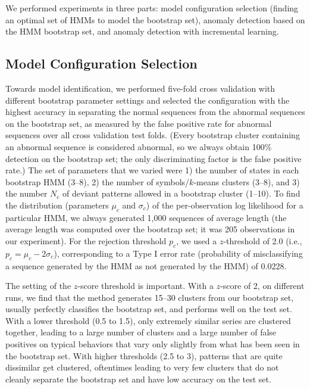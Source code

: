 We performed experiments in three parts: model configuration selection
(finding an optimal set of HMMs to model the bootstrap set), anomaly
detection based on the HMM bootstrap set, and anomaly detection with
incremental learning.

\subsection{Model Configuration Selection}
\label{incremental-model-selection}

Towards model identification, we performed five-fold cross validation
with different bootstrap parameter settings and selected the
configuration with the highest accuracy in separating the normal
sequences from the abnormal sequences on the bootstrap set, as
measured by the false positive rate for abnormal sequences over all
cross validation test folds. (Every bootstrap cluster containing an
abnormal sequence is considered abnormal, so we always obtain 100\%
detection on the bootstrap set; the only discriminating factor is the
false positive rate.) The set of parameters that we varied were 1) the
number of states in each bootstrap HMM (3--8), 2) the number of
symbols/$k$-means clusters (3--8), and 3) the number $N_c$ of deviant
patterns allowed in a bootstrap cluster (1--10). To find the
distribution (parameters $\mu_c$ and $\sigma_c$) of the
per-observation log likelihood for a particular HMM, we always
generated 1,000 sequences of average length (the average length was
computed over the bootstrap set; it was 205 observations in our
experiment). For the rejection threshold $p_c$, we used a
$z$-threshold of 2.0 (i.e., $p_c = \mu_c - 2\sigma_c$), corresponding
to a Type I error rate (probability of misclassifying a sequence
generated by the HMM as not generated by the HMM) of 0.0228.

The setting of the $z$-score threshold is important. With a $z$-score
of 2, on different runs, we find that the method generates 15--30
clusters from our bootstrap set, usually perfectly classifies the
bootstrap set, and performs well on the test set. With a lower
threshold (0.5 to 1.5), only extremely similar series are clustered
together, leading to a large number of clusters and a large number of
false positives on typical behaviors that vary only slightly from what
has been seen in the bootstrap set. With higher thresholds (2.5 to 3),
patterns that are quite dissimilar get clustered, oftentimes leading
to very few clusters that do not cleanly separate the bootstrap set
and have low accuracy on the test set.

